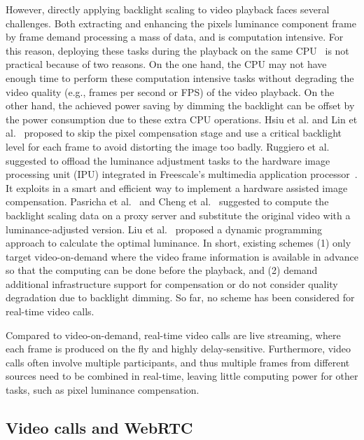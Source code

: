 However, directly applying backlight scaling to video playback faces
several challenges. Both extracting and enhancing the pixels luminance
component frame by frame demand processing a mass of data, and is
computation intensive.  For this reason, deploying these tasks during
the playback on the same CPU~\cite{CHP07, CSC02} is not practical
because of two reasons.  On the one hand, the CPU may not have enough
time to perform these computation intensive tasks without degrading
the video quality (e.g., frames per second or FPS) of the video
playback. On the other hand, the achieved power saving by dimming the
backlight can be offset by the power consumption due to these extra
CPU operations. Hsiu et al. and Lin et al.~\cite{LHH14, HLH11}
proposed to skip the pixel compensation stage and use a critical
backlight level for each frame to avoid distorting the image too
badly. Ruggiero et al. suggested to offload the luminance adjustment
tasks to the hardware image processing unit (IPU) integrated in
Freescale’s multimedia application processor~\cite{RBB08}. It exploits
in a smart and efficient way to implement a hardware assisted image
compensation.  Pasricha et al.~\cite{PMLDV03} and Cheng et
al.~\cite{CMEDV07} suggested to compute the backlight scaling data on
a proxy server and substitute the original video with a
luminance-adjusted version. Liu et al.~\cite{CAD} proposed a dynamic
programming approach to calculate the optimal luminance.
 In short, existing schemes (1) only target
video-on-demand where the video frame information is available in
advance so that the computing can be done before the playback, and (2)
demand additional infrastructure support for compensation or do not
consider quality degradation due to backlight dimming. So far, no
scheme has been considered for real-time video calls.

Compared to video-on-demand, real-time video calls are live streaming,
where each frame is produced on the fly and highly
delay-sensitive. Furthermore, video calls often involve multiple
participants, and thus multiple frames from different sources need
to be combined in real-time, leaving little computing power for other
tasks, such as pixel luminance compensation.

\subsection{Video calls and WebRTC}

